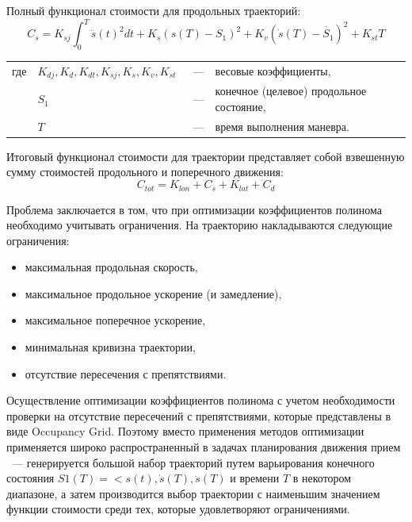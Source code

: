 Полный функционал стоимости для продольных траекторий:
\begin{equation}
      \label{eq:cost_lon}
      C_s = K_{sj} \int_{0}^{T}{\dddot{s}(t)^2dt} + K_s (s(T) - S_1)^2 + K_v (\dot{s}(T) - \dot{S_1})^2 + K_{st} T
\end{equation}

\noindent\begin{tabularx}{\linewidth}{lllX}
      где & $K_{dj}, K_d, K_{dt}, K_{sj}, K_s, K_v, K_{st}$ &~---& весовые коэффициенты, \\
          & $S_1$                                           &~---& конечное (целевое) продольное состояние, \\
          & $T$                                             &~---& время выполнения маневра. \\
\end{tabularx}

Итоговый функционал стоимости для траектории представляет собой взвешенную сумму стоимостей продольного и
поперечного движения:
\begin{equation}
      \label{eq:cost_tot}
      C_{tot} = K_{lon} + C_s + K_{lat} + C_d
\end{equation}

Проблема заключается в том, что при оптимизации коэффициентов полинома необходимо учитывать ограничения. На траекторию
накладываются следующие ограничения:
\begin{itemize}
      \item максимальная продольная скорость,
      \item максимальное продольное ускорение (и замедление),
      \item максимальное поперечное ускорение,
      \item минимальная кривизна траектории,
      \item отсутствие пересечения с препятствиями.
\end{itemize}

Осуществление оптимизации коэффициентов полинома с учетом необходимости проверки на отсутствие пересечений с
препятствиями, которые представлены в виде Occupancy Grid. Поэтому вместо применения методов оптимизации применяется
широко распространенный в задачах планирования движения прием ~--- генерируется большой набор траекторий путем
варьирования конечного состояния $S1(T) = <s(t), \dot{s}(T), \ddot{s}(T)$ и времени $T$ в некотором диапазоне, а затем
производится выбор траектории с наименьшим значением функции стоимости среди тех, которые удовлетворяют ограничениями.

